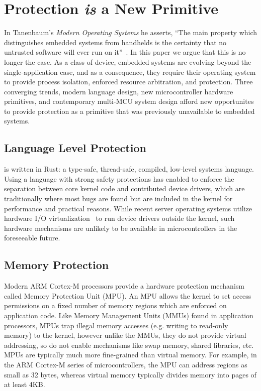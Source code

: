 \section{Protection \emph{is} a New Primitive}

In Tanenbaum's \emph{Modern Operating Systems} he asserts, ``The main property
which distinguishes embedded systems from handhelds is the certainty that no
untrusted software will ever run on it''~\cite{tanenbaum}. In this paper we
argue that this is no longer the case. As a class of device, embedded systems
are evolving beyond the single-application case, and as a consequence, they
require their operating system to provide process isolation, enforced resource
arbitration, and protection.
%
Three converging trends, modern language design, new microcontroller hardware
primitives, and contemporary multi-MCU system design afford new opportunites
to provide protection as a primitive that was previously unavailable to
embedded systems.



\subsection{Language Level Protection}

\name is written in Rust: a type-safe, thread-safe, compiled, low-level systems
language. Using a language with strong safety protections has enabled \name to
enforce the separation between core kernel code and contributed device
drivers, which are traditionally where most bugs are found but are included in
the kernel for performance and practical reasons. While recent server operating
systems utilize hardware I/O virtualization~\cite{arrakis:osdi2014, ix:osdi2014}
to run device drivers outside the kernel, such hardware mechanisms are unlikely
to be available in microcontrollers in the foreseeable future.

\subsection{Memory Protection}

Modern ARM Cortex-M processors provide a hardware protection mechanism called
Memory Protection Unit (MPU).  An MPU allows the kernel to set access
permissions on a fixed number of memory regions which are enforced on
application code. Like Memory Management Units (MMUs) found in application
processors, MPUs trap illegal memory accesses (e.g. writing to read-only memory)
to the kernel, however unlike the MMUs, they do not provide virtual addressing,
so do not enable mechanisms like swap memory, shared libraries, etc. MPUs are
typically much more fine-grained than virtual memory. For example, in the ARM
Cortex-M series of microcontrollers, the MPU can address regions as small as 32
bytes, whereas virtual memory typically divides memory into pages of at least
4KB.


